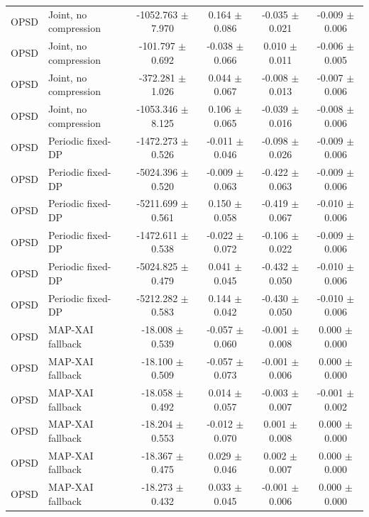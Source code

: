 \begin{table}[t]
\begin{tabular}{llcccc}
OPSD & Joint, no compression & -1052.763 $\pm$ 7.970 & 0.164 $\pm$ 0.086 & -0.035 $\pm$ 0.021 & -0.009 $\pm$ 0.006 \\
OPSD & Joint, no compression & -101.797 $\pm$ 0.692 & -0.038 $\pm$ 0.066 & 0.010 $\pm$ 0.011 & -0.006 $\pm$ 0.005 \\
OPSD & Joint, no compression & -372.281 $\pm$ 1.026 & 0.044 $\pm$ 0.067 & -0.008 $\pm$ 0.013 & -0.007 $\pm$ 0.006 \\
OPSD & Joint, no compression & -1053.346 $\pm$ 8.125 & 0.106 $\pm$ 0.065 & -0.039 $\pm$ 0.016 & -0.008 $\pm$ 0.006 \\
OPSD & Periodic fixed-DP & -1472.273 $\pm$ 0.526 & -0.011 $\pm$ 0.046 & -0.098 $\pm$ 0.026 & -0.009 $\pm$ 0.006 \\
OPSD & Periodic fixed-DP & -5024.396 $\pm$ 0.520 & -0.009 $\pm$ 0.063 & -0.422 $\pm$ 0.063 & -0.009 $\pm$ 0.006 \\
OPSD & Periodic fixed-DP & -5211.699 $\pm$ 0.561 & 0.150 $\pm$ 0.058 & -0.419 $\pm$ 0.067 & -0.010 $\pm$ 0.006 \\
OPSD & Periodic fixed-DP & -1472.611 $\pm$ 0.538 & -0.022 $\pm$ 0.072 & -0.106 $\pm$ 0.022 & -0.009 $\pm$ 0.006 \\
OPSD & Periodic fixed-DP & -5024.825 $\pm$ 0.479 & 0.041 $\pm$ 0.045 & -0.432 $\pm$ 0.050 & -0.010 $\pm$ 0.006 \\
OPSD & Periodic fixed-DP & -5212.282 $\pm$ 0.583 & 0.144 $\pm$ 0.042 & -0.430 $\pm$ 0.050 & -0.010 $\pm$ 0.006 \\
OPSD & MAP-XAI fallback & -18.008 $\pm$ 0.539 & -0.057 $\pm$ 0.060 & -0.001 $\pm$ 0.008 & 0.000 $\pm$ 0.000 \\
OPSD & MAP-XAI fallback & -18.100 $\pm$ 0.509 & -0.057 $\pm$ 0.073 & -0.001 $\pm$ 0.006 & 0.000 $\pm$ 0.000 \\
OPSD & MAP-XAI fallback & -18.058 $\pm$ 0.492 & 0.014 $\pm$ 0.057 & -0.003 $\pm$ 0.007 & -0.001 $\pm$ 0.002 \\
OPSD & MAP-XAI fallback & -18.204 $\pm$ 0.553 & -0.012 $\pm$ 0.070 & 0.001 $\pm$ 0.008 & 0.000 $\pm$ 0.000 \\
OPSD & MAP-XAI fallback & -18.367 $\pm$ 0.475 & 0.029 $\pm$ 0.046 & 0.002 $\pm$ 0.007 & 0.000 $\pm$ 0.000 \\
OPSD & MAP-XAI fallback & -18.273 $\pm$ 0.432 & 0.033 $\pm$ 0.045 & -0.001 $\pm$ 0.006 & 0.000 $\pm$ 0.000 \\
\bottomrule
\end{tabular}
\end{table}
